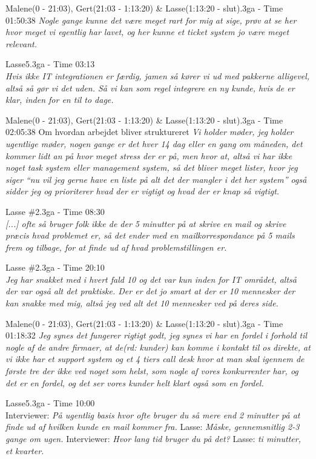 \begin{thebibliography}{9}
	Malene(0 - 21:03), Gert(21:03 - 1:13:20) \& Lasse(1:13:20 - slut).3ga - Time 01:50:38
	\textit{Nogle gange kunne det være meget rart for mig at sige, prøv at se her hvor meget vi egentlig har lavet, og her kunne et ticket system jo være meget relevant.}

	Lasse5.3ga - Time 03:13 \\
	\textit{Hvis ikke IT integrationen er færdig, jamen så kører vi ud med pakkerne alligevel, altså så gør vi det uden. Så vi kan som regel integrere en ny kunde, hvis de er klar, inden for en til to dage.}

	Malene(0 - 21:03), Gert(21:03 - 1:13:20) \& Lasse(1:13:20 - slut).3ga - Time 02:05:38
	Om hvordan arbejdet bliver struktureret \textit{Vi holder møder, jeg holder ugentlige møder, nogen gange er det hver 14 dag eller en gang om måneden, det kommer lidt an på hvor meget stress der er på, men hvor at, altså vi har ikke noget task system eller management system, så det bliver meget lister, hvor jeg siger “nu vil jeg gerne have en liste på alt det der mangler i det her system” også sidder jeg og prioriterer hvad der er vigtigt og hvad der er knap så vigtigt.}

	Lasse \#2.3ga - Time 08:30\\
	\textit{[...] ofte så bruger folk ikke de der 5 minutter på at skrive en mail og skrive præcis hvad problemet er, så det ender med en mailkorrespondance på 5 mails frem og tilbage, for at finde ud af hvad problemstillingen er.}

	Lasse \#2.3ga - Time 20:10\\
	\textit{Jeg har snakket med i hvert fald 10 og det var kun inden for IT området, altså der var også alt det praktiske. Der er det jo smart at der er 10 mennesker der kan snakke med mig, altså jeg ved alt det 10 mennesker ved på deres side.}

	Malene(0 - 21:03), Gert(21:03 - 1:13:20) \& Lasse(1:13:20 - slut).3ga - Time 01:18:32
	\textit{Jeg synes det fungerer rigtigt godt, jeg synes vi har en fordel i forhold til nogle af de andre firmaer, at de\emph{(rd: kunder)} kan komme i kontakt til os direkte, at vi ikke har et support system og et 4 tiers call desk hvor at man skal igennem de første tre der ikke ved noget som helst, som nogle af vores konkurrenter har, og det er en fordel, og det ser vores kunder helt klart også som en fordel.}

	Lasse5.3ga - Time 10:00 \\
	Interviewer: \textit{På ugentlig basis hvor ofte bruger du så mere end 2 minutter på at finde ud af hvilken kunde en mail kommer fra.} Lasse: \textit{Måske, gennemsnitlig 2-3 gange om ugen.} Interviewer: \textit{Hvor lang tid bruger du på det?} Lasse: \textit{ti minutter, et kvarter.}


\end{thebibliography}

